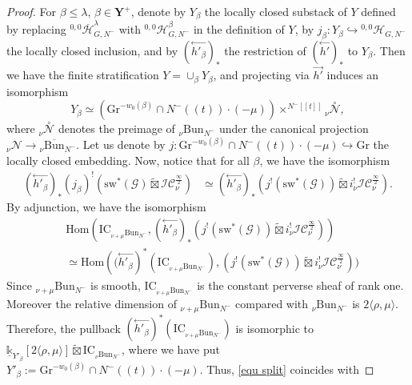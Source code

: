 \documentclass[11pt]{amsart}
\theoremstyle{plain}
\theoremstyle{remark}
\numberwithin{equation}{section}
\begin{document}
\begin{proof}
		For $\beta\leq \lambda$, $\beta\in\mathbf{Y}^+$, denote by $Y_\beta$ the locally closed substack of $Y$ defined by replacing ${^{0,0}\overline{\mathcal{H}}^\lambda_{G,N^-}}$ with ${^{0,0}\mathcal{H}}^\beta_{G,N^-}$ in the definition of $Y$, by $j_\beta:Y_\beta\hookrightarrow {^{0,0}\mathcal{H}_{G,N^{-}}}$ the locally closed inclusion, and by $(\overset{\leftarrow}{h'_\beta})_*$ the restriction of $(\overset{\leftarrow}{h'})_*$ to $Y_\beta$. Then we have the finite stratification $Y=\cup_\beta Y_\beta$, and projecting via $\overset{\rightarrow}{h'}$ induces an isomorphism
		\begin{equation*}\label{iden Y_b}
			Y_\beta\simeq \left(\mathrm{Gr}^{-w_0(\beta)}\cap N^-((t))\cdot (-\mu)\right)\times^{N^-[[t]]}{_\nu\overset{\circ}{\mathcal{N}}},
		\end{equation*}
		where ${_\nu\overset{\circ}{\mathcal{N}}}$ denotes the preimage of ${_{\nu}\mathrm{Bun}_{N^-}}$ under the canonical projection $_\nu\mathcal{N}\to {_{ \nu}\overline{\mathrm{Bun}}_{N^-}}$. Let us denote by $j:\mathrm{Gr}^{-w_0(\beta)}\cap N^-((t))\cdot (-\mu)\hookrightarrow\mathrm{Gr}$ the locally closed embedding. Now, notice that for all $\beta$, we have the isomorphism
		\begin{align*}
			(\overset{\leftarrow}{h'_\beta})_*(j_{\beta})^!(\mathrm{sw}^*(\mathcal{G})\widetilde{\boxtimes}\mathcal{IC}^{\frac{\infty}{2}}_\nu)
			&\simeq  (\overset{\leftarrow}{h'_\beta})_* (j^!(\mathrm{sw}^*(\mathcal{G}))\widetilde{\boxtimes} i_\nu^!\mathcal{IC}^{\frac{\infty}{2}}_\nu).
		\end{align*}
		By adjunction, we have the isomorphism 
		\begin{equation}\label{equ split}
			\begin{split}
				&\mathrm{Hom}(\mathrm{IC}_{_{\nu+\mu}\mathrm{Bun}_{N^-}},(\overset{\leftarrow}{h'_\beta})_* (j^!(\mathrm{sw}^*(\mathcal{G}))\widetilde{\boxtimes} i_\nu^!\mathcal{IC}^{\frac{\infty}{2}}_\nu))\\&\simeq \mathrm{Hom}(\mathrm (\overset{\leftarrow}{h'_\beta})^*(\mathrm{IC}_{_{\nu+\mu}\mathrm{Bun}_{N^-}}), (j^!(\mathrm{sw}^*(\mathcal{G}))\widetilde{\boxtimes} i_\nu^!\mathcal{IC}^{\frac{\infty}{2}}_\nu))
			\end{split}
		\end{equation}
		Since $_{\nu+\mu}\mathrm{Bun}_{N^-}$ is smooth, $\mathrm{IC}_{_{\nu+\mu}\mathrm{Bun}_{N^-}}$ is the constant perverse sheaf of rank one. Moreover the relative dimension of $_{\nu+\mu}\mathrm{Bun}_{N^-}$ compared with $_{\nu}\mathrm{Bun}_{N^-}$ is $2\langle\rho,\mu\rangle$. Therefore, the pullback $(\overset{\leftarrow}{h'_\beta})^*(\mathrm{IC}_{_{\nu+\mu}\mathrm{Bun}_{N^-}})$ is isomorphic to $\underline{\mathbb{k}}_{Y'_\beta}[2\langle\rho,\mu\rangle]\widetilde{\boxtimes}\mathrm{IC}_{_{\nu}\mathrm{Bun}_{N^-}}$, where we have put $Y'_\beta:=\mathrm{Gr}^{-w_0(\beta)}\cap N^-((t))\cdot (-\mu)$. Thus, \eqref{equ split} coincides with

\end{proof}
\end{document}

